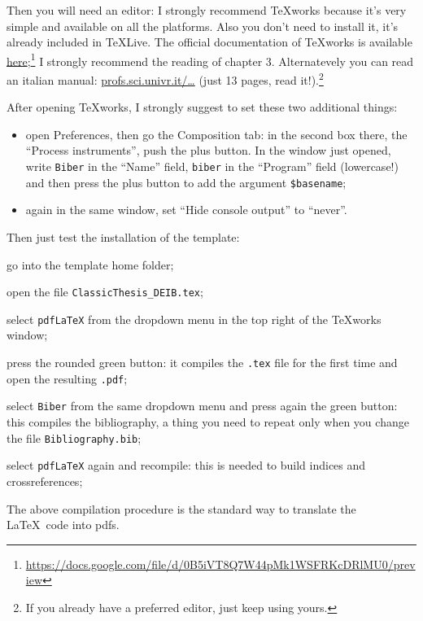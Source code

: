 Then you will need an editor: I strongly recommend TeXworks because it's very simple and available on all the platforms.
Also you don't need to install it, it's already included in TeXLive.
The official documentation of TeXworks is available \href{https://docs.google.com/file/d/0B5iVT8Q7W44pMk1WSFRKcDRlMU0/preview}{here};\footnote{\url{https://docs.google.com/file/d/0B5iVT8Q7W44pMk1WSFRKcDRlMU0/preview}}
I strongly recommend the reading of chapter 3.
Alternatevely you can read an italian manual: \href{http://profs.sci.univr.it/~gregorio/introtexworks.pdf}{profs.sci.univr.it/\ldots} (just 13 pages, read it!).\footnote{If you already have a preferred editor, just keep using yours.}

After opening TeXworks, I strongly suggest to set these two additional things:
\begin{itemize}
	\item open Preferences, then go the Composition tab: in the second box there, the \enquote{Process instruments}, push the plus button.
In the window just opened, write \verb!Biber! in the \enquote{Name} field, \verb!biber! in the \enquote{Program} field (lowercase!) and then press the plus button to add the argument \verb!$basename!;
	\item again in the same window, set \enquote{Hide console output} to \enquote{never}.
\end{itemize}

Then just test the installation of the template:
\begin{aenumerate}
	\item go into the template home folder;
	\item open the file \verb!ClassicThesis_DEIB.tex!;
	\item select \verb!pdfLaTeX! from the dropdown menu in the top right of the TeXworks window;
	\item press the rounded green button: it compiles the \verb!.tex! file for the first time and open the resulting \verb!.pdf!;
	\item select \verb!Biber! from the same dropdown menu and press again the green button: this compiles the bibliography, a thing you need to repeat only when you change the file \verb!Bibliography.bib!;
	\item select \verb!pdfLaTeX! again and recompile: this is needed to build indices and crossreferences;
\end{aenumerate}
The above compilation procedure is the standard way to translate the \LaTeX\ code into pdfs.

